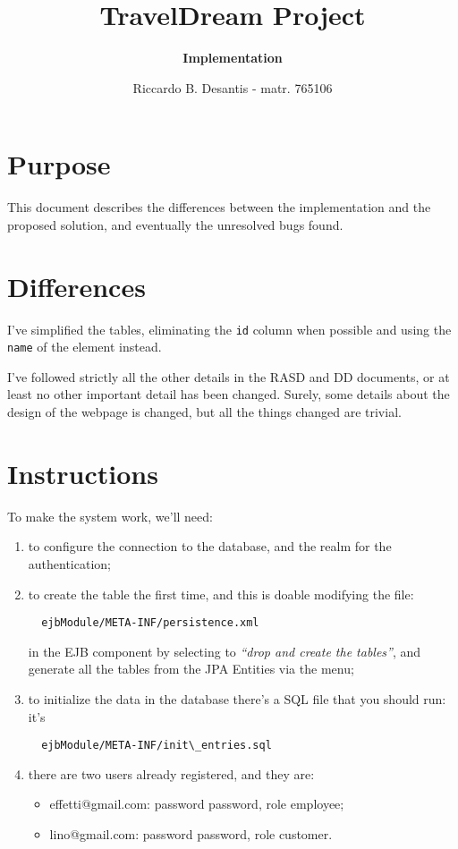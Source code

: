 \documentclass[a4paper,12pt]{article}
\begin{document}
\title{\textbf{TravelDream Project}}
\author{\textbf{Implementation}}
\date{Riccardo B. Desantis - matr. 765106}

\maketitle

\section{Purpose}
This document describes the differences between the implementation and the proposed solution, and eventually the unresolved bugs found.

\section{Differences}
I've simplified the tables, eliminating the \texttt{id} column when possible and using the \texttt{name} of the element instead.\newline

I've followed strictly all the other details in the RASD and DD documents, or at least no other important detail has been changed. Surely, some details about the design of the webpage is changed, but all the things changed are trivial.

\section{Instructions}
To make the system work, we'll need:
\begin{enumerate}
  \item to configure the connection to the database, and the realm for the authentication;
  \item to create the table the first time, and this is doable modifying the file:
  \begin{verbatim}
  ejbModule/META-INF/persistence.xml\end{verbatim}
  in the EJB component by selecting to \textit{``drop and create the tables''}, and generate all the tables from the JPA Entities via the menu;
  \item to initialize the data in the database there's a SQL file that you should run: it's
  \begin{verbatim}
  ejbModule/META-INF/init\_entries.sql\end{verbatim}
  \item there are two users already registered, and they are:
  \begin{itemize}
    \item effetti@gmail.com: password password, role employee;
    \item lino@gmail.com: password password, role customer.
  \end{itemize}
\end{enumerate}
\end{document}
